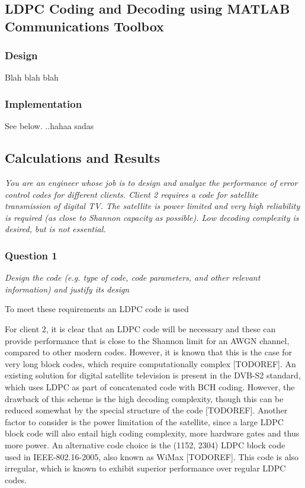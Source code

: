 \documentclass[a4paper]{article}
\begin{document}
\subsection{LDPC Coding and Decoding using MATLAB Communications Toolbox}

\subsubsection{Design}

 Blah blah blah 
 
\subsubsection{Implementation}

See below. ..hahaa sadas
 
\subsection{Calculations and Results}

\textit{You are an engineer whose job is to design and analyze the performance of error control codes for different clients. Client 2 requires a code for satellite transmission of digital TV. The satellite is power limited and very high reliability is required (as close to Shannon capacity as possible). Low decoding complexity is desired, but is not essential.} 
\subsubsection{Question 1} \textit{Design the code (e.g. type of code, code parameters, and other relevant information) and justify its design}


To meet these requirements an LDPC code is used

For client 2, it is clear that an LDPC code will be necessary and these can provide performance that is close to the Shannon limit for an AWGN channel, compared to other modern codes. However, it is known that this is the case for very long block codes, which require computationally complex [TODOREF].
An existing solution for digital satellite television is present in the DVB-S2
standard, which uses LDPC as part of concatenated code with BCH coding\cite{morello2006dvb}. However,
the drawback of this scheme is the high decoding complexity, though this can be 
reduced somewhat by the special structure of the code [TODOREF]. Another factor to consider is the power limitation of the satellite, since a large LDPC block code will also entail high coding complexity, more hardware gates and thus more power. An alternative code choice
is the (1152, 2304) LDPC block code used in IEEE-802.16-2005, also known as WiMax [TODOREF]. This code is also irregular, which is known to exhibit superior performance over regular LDPC codes.
\end{document}
